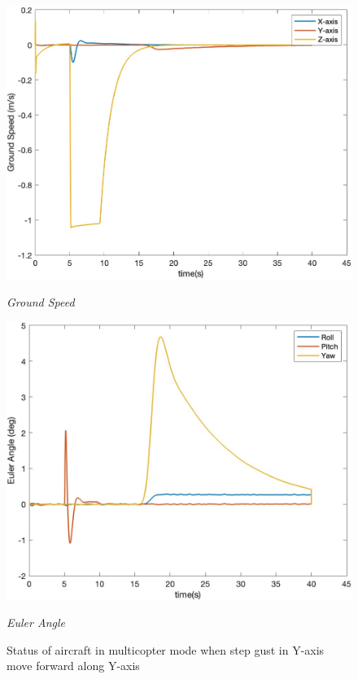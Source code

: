 \begin{figure}[htbp]
\begin{minipage}[b]{0.45\textwidth}
    \centering
    \includegraphics[width=\textwidth]{Images/Gust/VTOL step/3 groundspeed_5.jpg}
    \caption*{\textit{Ground Speed}}
  \end{minipage}
  \hfil
  \begin{minipage}[b]{0.45\textwidth}
    \centering
    \includegraphics[width=\textwidth]{Images/Gust/VTOL step/4 EulerAngle_5.jpg}
    \caption*{\textit{Euler Angle}}
  \end{minipage}
  \caption{Status of aircraft in multicopter mode when step gust in Y-axis move forward along Y-axis}
  \label{fig:VTOL step yy}
\end{figure}

